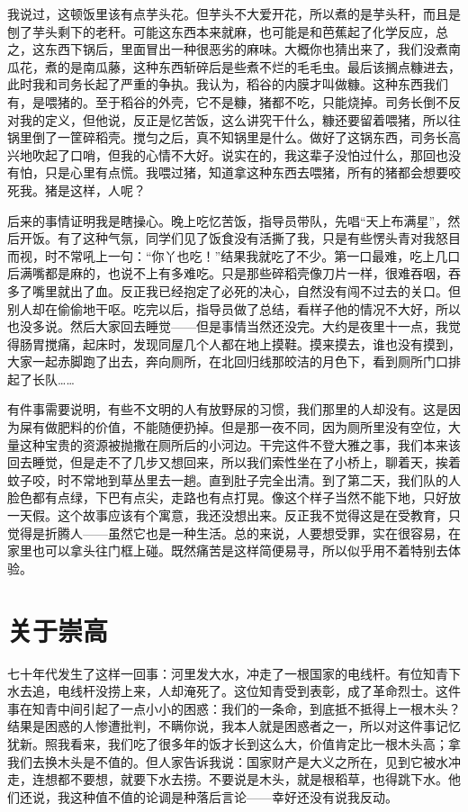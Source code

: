 我说过，这顿饭里该有点芋头花。但芋头不大爱开花，所以煮的是芋头秆，而且是刨了芋头剩下的老秆。可能这东西本来就麻，也可能是和芭蕉起了化学反应，总之，这东西下锅后，里面冒出一种很恶劣的麻味。大概你也猜出来了，我们没煮南瓜花，煮的是南瓜藤，这种东西斩碎后是些煮不烂的毛毛虫。最后该搁点糠进去，此时我和司务长起了严重的争执。我认为，稻谷的内膜才叫做糠。这种东西我们有，是喂猪的。至于稻谷的外壳，它不是糠，猪都不吃，只能烧掉。司务长倒不反对我的定义，但他说，反正是忆苦饭，这么讲究干什么，糠还要留着喂猪，所以往锅里倒了一筐碎稻壳。搅匀之后，真不知锅里是什么。做好了这锅东西，司务长高兴地吹起了口哨，但我的心情不大好。说实在的，我这辈子没怕过什么，那回也没有怕，只是心里有点慌。我喂过猪，知道拿这种东西去喂猪，所有的猪都会想要咬死我。猪是这样，人呢？　 

后来的事情证明我是瞎操心。晚上吃忆苦饭，指导员带队，先唱“天上布满星”，然后开饭。有了这种气氛，同学们见了饭食没有活撕了我，只是有些愣头青对我怒目而视，时不常吼上一句：“你丫也吃！”结果我就吃了不少。第一口最难，吃上几口后满嘴都是麻的，也说不上有多难吃。只是那些碎稻壳像刀片一样，很难吞咽，吞多了嘴里就出了血。反正我已经抱定了必死的决心，自然没有闯不过去的关口。但别人却在偷偷地干呕。吃完以后，指导员做了总结，看样子他的情况不大好，所以也没多说。然后大家回去睡觉——但是事情当然还没完。大约是夜里十一点，我觉得肠胃搅痛，起床时，发现同屋几个人都在地上摸鞋。摸来摸去，谁也没有摸到，大家一起赤脚跑了出去，奔向厕所，在北回归线那皎洁的月色下，看到厕所门口排起了长队……　 

有件事需要说明，有些不文明的人有放野尿的习惯，我们那里的人却没有。这是因为屎有做肥料的价值，不能随便扔掉。但是那一夜不同，因为厕所里没有空位，大量这种宝贵的资源被抛撒在厕所后的小河边。干完这件不登大雅之事，我们本来该回去睡觉，但是走不了几步又想回来，所以我们索性坐在了小桥上，聊着天，挨着蚊子咬，时不常地到草丛里去一趟。直到肚子完全出清。到了第二天，我们队的人脸色都有点绿，下巴有点尖，走路也有点打晃。像这个样子当然不能下地，只好放一天假。这个故事应该有个寓意，我还没想出来。反正我不觉得这是在受教育，只觉得是折腾人——虽然它也是一种生活。总的来说，人要想受罪，实在很容易，在家里也可以拿头往门框上碰。既然痛苦是这样简便易寻，所以似乎用不着特别去体验。　

\chapter{关于崇高}

七十年代发生了这样一回事：河里发大水，冲走了一根国家的电线杆。有位知青下水去追，电线杆没捞上来，人却淹死了。这位知青受到表彰，成了革命烈士。这件事在知青中间引起了一点小小的困惑：我们的一条命，到底抵不抵得上一根木头？结果是困惑的人惨遭批判，不瞒你说，我本人就是困惑者之一，所以对这件事记忆犹新。照我看来，我们吃了很多年的饭才长到这么大，价值肯定比一根木头高；拿我们去换木头是不值的。但人家告诉我说：国家财产是大义之所在，见到它被水冲走，连想都不要想，就要下水去捞。不要说是木头，就是根稻草，也得跳下水。他们还说，我这种值不值的论调是种落后言论——幸好还没有说我反动。　 

